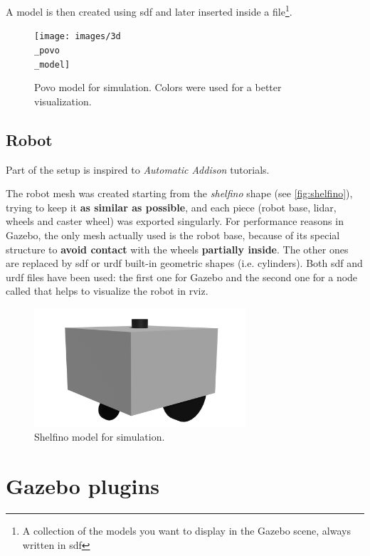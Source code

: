 A model is then created using \acrfull{sdf} and later inserted inside a  file\footnote{A collection of the models you want to display in the Gazebo scene, always written in \acrshort{sdf}}.

\begin{figure}[h]
    \centering
    \texttt{[image: images/3d\\\_povo\\\_model]}
    \caption{Povo model for simulation. Colors were used for a better visualization.}
\end{figure}

\subsection{Robot}
\label{sub:robot}

Part of the setup is inspired to \textit{Automatic Addison} tutorials\cite{tutorials}.

The robot mesh was created starting from the \textit{shelfino} shape (see \autoref{fig:shelfino}), trying to keep it \textbf{as similar as possible}, and each piece (robot base, lidar, wheels and caster wheel) was exported singularly. For performance reasons in Gazebo, the only mesh actually used is the robot base, because of its special structure to \textbf{avoid contact} with the wheels \textbf{partially inside}. The other ones are replaced by \acrshort{sdf} or \acrfull{urdf} built-in geometric shapes (i.e. cylinders).
Both \acrshort{sdf} and \acrshort{urdf} files have been used: the first one for Gazebo and the second one for a node called  that helps to visualize the robot in \acrshort{rviz}.

\begin{figure}[h]
    \centering
    \includegraphics[width=0.7\textwidth]{images/shelfino_3d.png}
    \caption{Shelfino model for simulation.}
\end{figure}

\section{Gazebo plugins}


